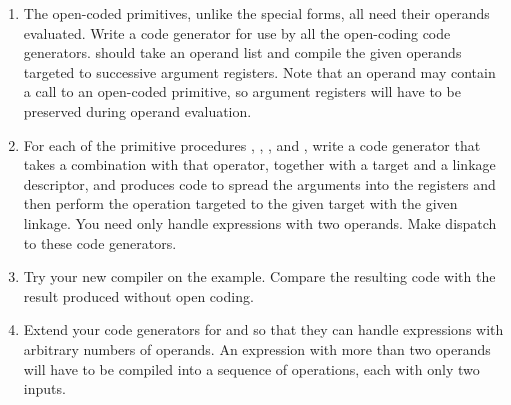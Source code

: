 \begin{exercise}
\begin{enumerate}[label = \alph*., leftmargin = *]
		\item
			The open-coded primitives, unlike the special forms, all need their operands evaluated.
			Write a code generator  for use by all the open-coding code generators.
			 should take an operand list and compile the given operands targeted to successive argument registers.
			Note that an operand may contain a call to an open-coded primitive, so argument registers will have to be preserved during operand evaluation.

		\item
			For each of the primitive procedures \code{=}, \code{*}, \code{-}, and \code{+}, write a code generator that takes a combination with that operator, together with a target and a linkage descriptor, and produces code to spread the arguments into the registers and then perform the operation targeted to the given target with the given linkage.
			You need only handle expressions with two operands.
			Make  dispatch to these code generators.

		\item
			Try your new compiler on the  example.
			Compare the resulting code with the result produced without open coding.

		\item
			Extend your code generators for \code{+} and \code{*} so that they can handle expressions with arbitrary numbers of operands.
			An expression with more than two operands will have to be compiled into a sequence of operations, each with only two inputs.

	\end{enumerate}
\end{exercise}
